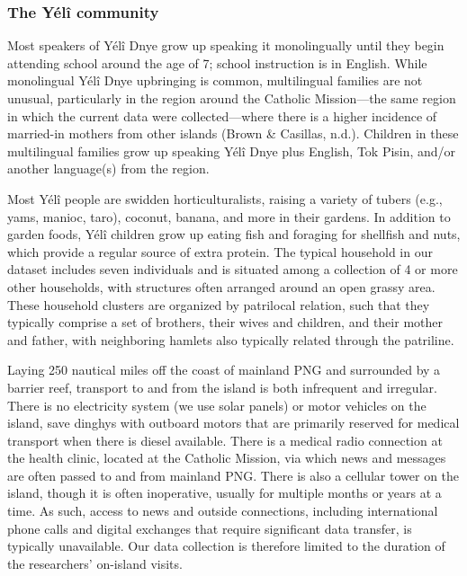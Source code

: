\documentclass[english,,man,floatsintext]{apa6}
\begin{document}
\hypertarget{the-yuxe9luxee-community}{%
\subsubsection{The Yélî community}\label{the-yuxe9luxee-community}}

Most speakers of Yélî Dnye grow up speaking it monolingually until they begin attending school around the age of 7; school instruction is in English. While monolingual Yélî Dnye upbringing is common, multilingual families are not unusual, particularly in the region around the Catholic Mission---the same region in which the current data were collected---where there is a higher incidence of married-in mothers from other islands (Brown \& Casillas, n.d.). Children in these multilingual families grow up speaking Yélî Dnye plus English, Tok Pisin, and/or another language(s) from the region.

Most Yélî people are swidden horticulturalists, raising a variety of tubers (e.g., yams, manioc, taro), coconut, banana, and more in their gardens. In addition to garden foods, Yélî children grow up eating fish and foraging for shellfish and nuts, which provide a regular source of extra protein. The typical household in our dataset includes seven individuals and is situated among a collection of 4 or more other households, with structures often arranged around an open grassy area. These household clusters are organized by patrilocal relation, such that they typically comprise a set of brothers, their wives and children, and their mother and father, with neighboring hamlets also typically related through the patriline.

Laying 250 nautical miles off the coast of mainland PNG and surrounded by a barrier reef, transport to and from the island is both infrequent and irregular. There is no electricity system (we use solar panels) or motor vehicles on the island, save dinghys with outboard motors that are primarily reserved for medical transport when there is diesel available. There is a medical radio connection at the health clinic, located at the Catholic Mission, via which news and messages are often passed to and from mainland PNG. There is also a cellular tower on the island, though it is often inoperative, usually for multiple months or years at a time. As such, access to news and outside connections, including international phone calls and digital exchanges that require significant data transfer, is typically unavailable. Our data collection is therefore limited to the duration of the researchers' on-island visits.
\end{document}
